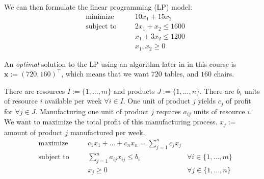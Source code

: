 \begin{exbox}
\begin{example}
        We can then formulate the linear programming (LP) model:
        \begin{equation}
            \begin{aligned}
                 & \text{minimize}   & \quad & 10x_1 + 15x_2             \\
                 & \text{subject to} &       & 2x_1 + x_2 \leqslant 1600 \\
                 &                   &       & x_1 + 3x_2 \leqslant 1200 \\
                 &                   &       & x_1, x_2 \geqslant  0
            \end{aligned}\tag{LP}
        \end{equation}

        An \emph{optimal} solution to the LP using an algorithm later in
        in this course is $ \bm{x}:=(720,160)^\top $, which means
        that we want $ 720 $ tables, and $ 160 $ chairs.
    \end{example}
\end{exbox}

\begin{exbox}
    \begin{example}
        There are resources $I:=\{1,\dots,m\}$ and products $J:=\{1,\dots,n\}$.
        There are $b_i$ units of resource
        $i$ available per week $\forall i\in I$. One unit of product $j$ yields $c_j$ of profit for
        $\forall j\in J$. Manufacturing one unit of product $j$ requires $a_{ij}$ units of resource $i$.
        We want to maximize the total profit of this manufacturing process.
        $x_j :=$ amount of product $j$ manufactured per week.
        \begin{equation}
            \begin{aligned}
                 & \text{maximize}   & \quad & c_1x_1 + \dots + c_nx_n = \sum\limits_{j=1}^n c_jx_j                             \\
                 & \text{subject to} &       & \sum\limits_{j=1}^n a_{ij}x_{ij}\leqslant b_i        & \forall i\in\{1,\dots,m\} \\
                 &                   &       & x_j\geqslant  0                                      & \forall j\in\{1,\dots,n\}
            \end{aligned}\tag{LP}\label{1.2}
        \end{equation}
    \end{example}
\end{exbox}

